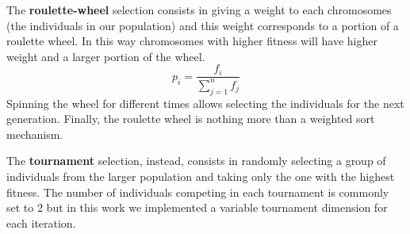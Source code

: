 The \textbf{roulette-wheel} selection consists in giving a weight to each chromosomes (the individuals in our population) and this weight corresponds to a portion of a roulette wheel.
In this way chromosomes with higher fitness will have higher weight and a larger portion of the wheel.
\begin{equation}
p_i = \frac{f_i}{\sum_{j = 1}^n f_j}
\end{equation}
Spinning the wheel for different times allows selecting the individuals for the next generation.
Finally, the roulette wheel is nothing more than a weighted sort mechanism.

The \textbf{tournament} selection, instead, consists in randomly selecting a group of individuals from the larger population and taking only the one with the highest fitness. 
The number of individuals competing in each tournament is commonly set to 2 but in this work we implemented a variable tournament dimension for each iteration.


